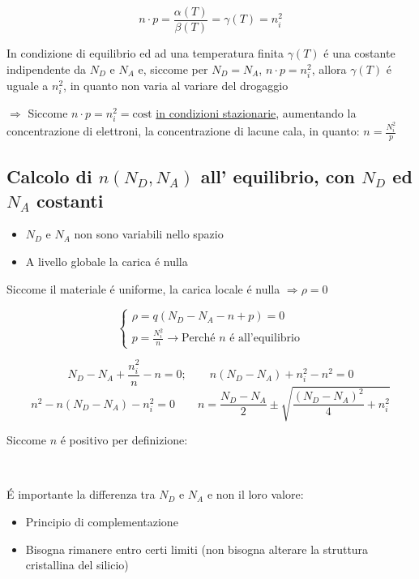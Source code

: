 \[
    n \cdot p = \frac{\alpha(T)}{\beta(T)} = \gamma(T) = n_i^2
\]

In condizione di equilibrio ed ad una temperatura finita $\gamma(T)$ \'e una costante indipendente da $N_D$ e $N_A$ e, siccome per $N_D = N_A$, $n \cdot p = n_i^2$, allora $\gamma(T)$ \'e uguale a $n_i^2$, in quanto non varia al variare del drogaggio

$\Rightarrow$ Siccome $ n \cdot p = n_i^2 = \text{cost}$ \underline{in condizioni stazionarie}, aumentando la concentrazione di elettroni, la concentrazione di lacune cala, in quanto: $n = \frac{N_i^2}{p}$

\subsection{Calcolo di $n(N_D, N_A)$ all' equilibrio, con $N_D$ ed $N_A$ costanti}
\begin{itemize}
    \item $N_D$ e $N_A$ non sono variabili nello spazio
    \item A livello globale la carica \'e nulla
\end{itemize}

Siccome il materiale \'e uniforme, la carica locale \'e nulla $\Rightarrow \rho = 0$

\[
\begin{cases*}
    \rho = q(N_D - N_A -n + p) = 0\\
    p = \frac{N_i^2}{n} \rightarrow \text{Perch\'e $n$ \'e all'equilibrio}
\end{cases*}
\]

\[
    N_D - N_A + \frac{n_i^2}{n} - n = 0; \qquad n(N_D - N_A) + n_i^2 - n^2 = 0
\]
\[
    n^2 - n(N_D - N_A) - n_i^2 = 0 \qquad n = \frac{N_D - N_A}{2} \pm \sqrt{\frac{(N_D - N_A)^2}{4} + n_i^2}
\]

Siccome $n$ \'e positivo per definizione:

\begin{center}
    \\
    \vspace{10px}
\end{center}

\'E importante la differenza tra $N_D$ e $N_A$ e non il loro valore:
\begin{itemize}
    \item Principio di complementazione
    \item Bisogna rimanere entro certi limiti (non bisogna alterare la struttura cristallina del silicio)
\end{itemize}

